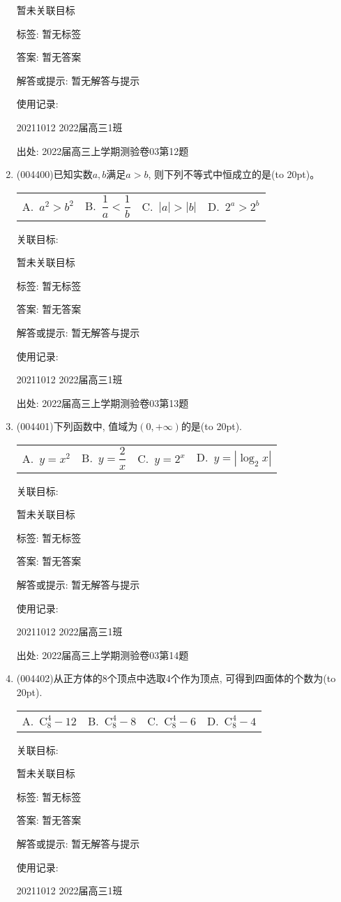 \documentclass[10pt,a4paper]{article}
\newcommand{\bracket}[1]{(\hbox to #1pt{})}
\newcommand{\fourch}[4]{\par\begin{tabular}{p{.23\textwidth}p{.23\textwidth}p{.23\textwidth}p{.23\textwidth}}
A.~#1 &B.~#2& C.~#3& D.~#4
\end{tabular}}
\begin{document}
\begin{enumerate}[1.]
暂未关联目标



标签: 暂无标签

答案: 暂无答案

解答或提示: 暂无解答与提示

使用记录:

20211012	2022届高三1班	


出处: 2022届高三上学期测验卷03第12题
\item { (004400)}已知实数$a,b$满足$a>b$, 则下列不等式中恒成立的是\bracket{20}。
\fourch{$a^2>b^2$}{$\dfrac 1a<\dfrac 1b$}{$|a|>|b|$}{$2^a>2^b$}


关联目标:

暂未关联目标



标签: 暂无标签

答案: 暂无答案

解答或提示: 暂无解答与提示

使用记录:

20211012	2022届高三1班	


出处: 2022届高三上学期测验卷03第13题
\item { (004401)}下列函数中, 值域为$(0,+\infty)$的是\bracket{20}.
\fourch{$y=x^2$}{$y=\dfrac 2x$}{$y=2^x$}{$y=|\log_2x|$}


关联目标:

暂未关联目标



标签: 暂无标签

答案: 暂无答案

解答或提示: 暂无解答与提示

使用记录:

20211012	2022届高三1班	


出处: 2022届高三上学期测验卷03第14题
\item { (004402)}从正方体的$8$个顶点中选取$4$个作为顶点, 可得到四面体的个数为\bracket{20}.
\fourch{$\mathrm{C}_8^4-12$}{$\mathrm{C}_8^4-8$}{$\mathrm{C}_8^4-6$}{$\mathrm{C}_8^4-4$}


关联目标:

暂未关联目标



标签: 暂无标签

答案: 暂无答案

解答或提示: 暂无解答与提示

使用记录:

20211012	2022届高三1班	



\end{enumerate}
\end{document}
